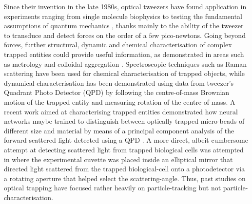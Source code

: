 \documentclass[final,  3p]{elsarticle}
\begin{document}
Since their invention in the late 1980s, optical tweezers have found application in experiments ranging from single molecule biophysics \cite{Bustamante2021Biophysics} to testing the fundamental assumptions of quantum mechanics \cite{yin2013large}, thanks mainly to the ability of the tweezer to transduce and detect forces on the order of a few pico-newtons. Going beyond forces, further structural, dynamic and chemical characterisation of complex trapped entities could provide useful information, as demonstrated in areas such as metrology \cite{arita2020coherent} and colloidal aggregation \cite{burns1990optical}.  Spectroscopic techniques such as Raman scattering \cite{gupta2014raman} have been used for chemical characterisation of trapped objects, while dynamical characterisation has been demonstrated using data from tweezer's Quadrant Photo Detector (QPD) by following the centre-of-mass Brownian motion of the trapped entity \cite{friedrich2012tuning} and measuring rotation of the centre-of-mass\cite{yifat2021facile}.  A recent work aimed at characterising trapped entities demonstrated how neural networks maybe trained to distinguish between optically trapped micro-beads of different size and material by means of a principal component analysis of the forward scattered light detected using a QPD \cite{Carvalho_2023}.  A more direct, albeit cumbersome attempt at detecting scattered light from trapped biological cells was attempted in \cite{Watson_2023} where the experimental cuvette was placed inside an elliptical mirror that directed light scattered from the trapped biological-cell onto a photodetector via a rotating aperture that helped select the scattering-angle. Thus, past studies on optical trapping have focused rather heavily on particle-tracking but not particle-characterisation.  
\end{document}
